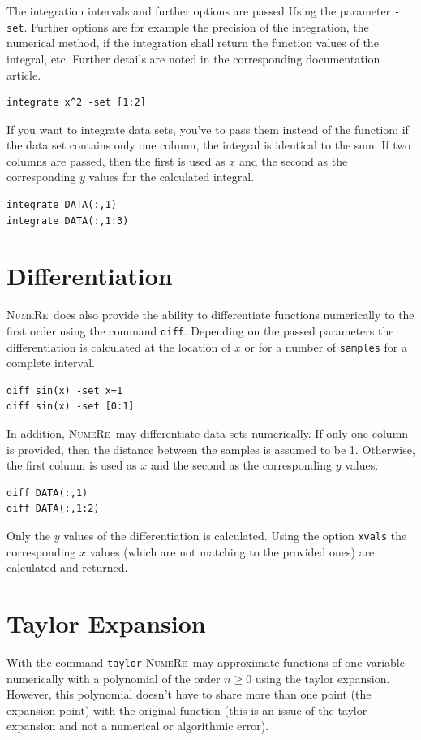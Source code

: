 \documentclass[DIV=14,headsepline,footsepline]{scrbook}
\newcommand{\NR}{\textsc{Nu\-me\-Re}}
\begin{document}
				The integration intervals and further options are passed Using the parameter \verb+-set+. Further options are for example the precision of the integration, the numerical method, if the integration shall return the function values of the integral, etc. Further details are noted in the corresponding documentation article.
				\begin{lstlisting}
integrate x^2 -set [1:2]
				\end{lstlisting}
				
				If you want to integrate data sets, you've to pass them instead of the function: if the data set contains only one column, the integral is identical to the sum. If two columns are passed, then the first is used as $x$ and the second as the corresponding $y$ values for the calculated integral.
				\begin{lstlisting}
integrate DATA(:,1)
integrate DATA(:,1:3)
				\end{lstlisting}
				
			\section{Differentiation}
				\NR\ does also provide the ability to differentiate functions numerically to the first order using the command \verb+diff+. Depending on the passed parameters the differentiation is calculated at the location of $x$ or for a number of \verb+samples+ for a complete interval.
				\begin{lstlisting}
diff sin(x) -set x=1
diff sin(x) -set [0:1]
				\end{lstlisting}
				
				In addition, \NR\ may differentiate data sets numerically. If only one column is provided, then the distance between the samples is assumed to be 1. Otherwise, the first column is used as $x$ and the second as the corresponding $y$ values.
				\begin{lstlisting}
diff DATA(:,1)
diff DATA(:,1:2)
				\end{lstlisting}
				Only the $y$ values of the differentiation is calculated. Using the option \verb+xvals+ the corresponding $x$ values (which are not matching to the provided ones) are calculated and returned.
				
			\section{Taylor Expansion}
				With the command \verb+taylor+ \NR\ may approximate functions of one variable numerically with a polynomial of the order $n\geq0$ using the taylor expansion. However, this polynomial doesn't have to share more than one point (the expansion point) with the original function (this is an issue of the taylor expansion and not a numerical or algorithmic error).
	
\end{document}
